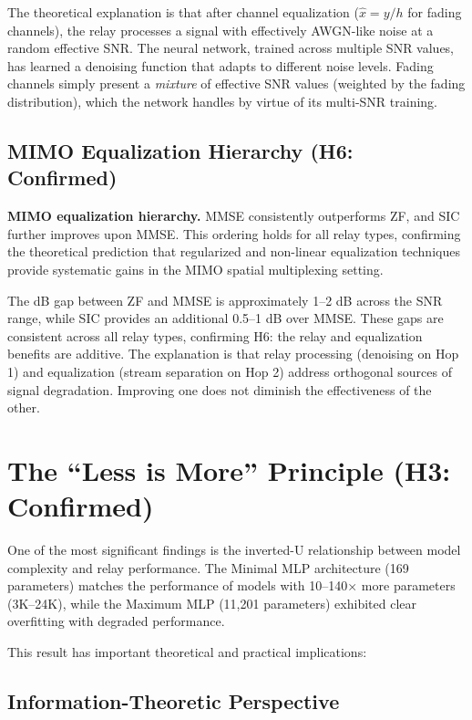 \documentclass[
  english,
  12pt,
  12pt,
  a4paper,
  oneside]{report}
\begin{document}
The theoretical explanation is that after channel equalization (\(\hat{x} = y/h\) for fading channels), the relay processes a signal with effectively AWGN-like noise at a random effective SNR. The neural network, trained across multiple SNR values, has learned a denoising function that adapts to different noise levels. Fading channels simply present a \emph{mixture} of effective SNR values (weighted by the fading distribution), which the network handles by virtue of its multi-SNR training.

\subsection{MIMO Equalization Hierarchy (H6: Confirmed)}\label{sec:mimo-equalization-hierarchy-h6-confirmed}

\textbf{MIMO equalization hierarchy.} MMSE consistently outperforms ZF, and SIC further improves upon MMSE. This ordering holds for all relay types, confirming the theoretical prediction that regularized and non-linear equalization techniques provide systematic gains in the MIMO spatial multiplexing setting.

The dB gap between ZF and MMSE is approximately 1--2 dB across the SNR range, while SIC provides an additional 0.5--1 dB over MMSE. These gaps are consistent across all relay types, confirming H6: the relay and equalization benefits are additive. The explanation is that relay processing (denoising on Hop 1) and equalization (stream separation on Hop 2) address orthogonal sources of signal degradation. Improving one does not diminish the effectiveness of the other.

\section{The ``Less is More'' Principle (H3: Confirmed)}\label{sec:the-less-is-more-principle-h3-confirmed}

One of the most significant findings is the inverted-U relationship between model complexity and relay performance. The Minimal MLP architecture (169 parameters) matches the performance of models with 10--140× more parameters (3K--24K), while the Maximum MLP (11,201 parameters) exhibited clear overfitting with degraded performance.

This result has important theoretical and practical implications:

\subsection{Information-Theoretic Perspective}\label{sec:information-theoretic-perspective}
\end{document}
